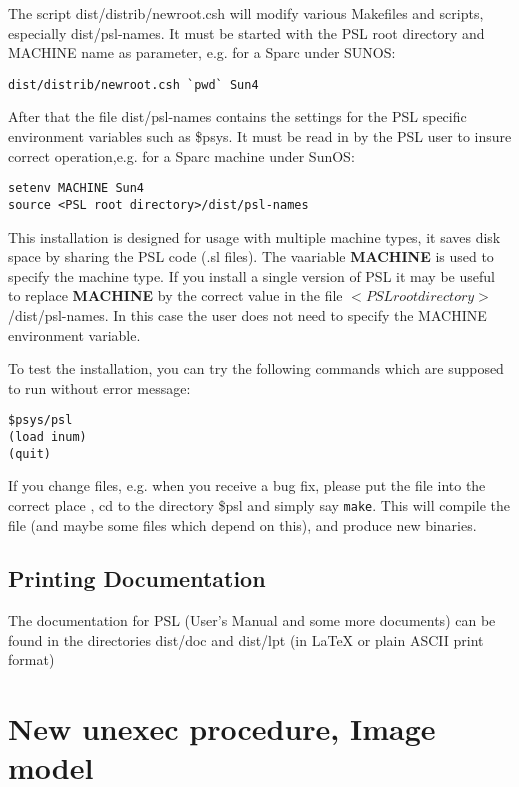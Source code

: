 The script dist/distrib/newroot.csh will modify various Makefiles and
scripts, especially dist/psl-names. It must be started with the
PSL root directory and MACHINE name as parameter, e.g. for a Sparc under
SUNOS:

\begin{verbatim}
dist/distrib/newroot.csh `pwd` Sun4
\end{verbatim}

After that the file dist/psl-names contains the settings for the  
PSL specific environment variables such as \$psys. It must be
read in by the PSL user to insure correct operation,e.g. for a
Sparc machine under SunOS:

\begin{verbatim}
setenv MACHINE Sun4
source <PSL root directory>/dist/psl-names
\end{verbatim}

This installation is designed for usage with multiple machine types,
it saves disk space by sharing the PSL code (.sl files).
The vaariable  {\bf MACHINE} is used to specify the machine type.
If you install a single version of PSL it may be useful to
replace {\bf MACHINE} by the correct value in the file
$<PSL root directory>$/dist/psl-names. In this case the
user does not need to specify the MACHINE environment variable.

To test the installation, you can try the following commands which
are supposed to run without error message:

\begin{verbatim}   
$psys/psl
(load inum)
(quit)
\end{verbatim}   

If you change files, e.g. when you receive a bug fix, please 
put the file into the correct place , cd to the directory \$psl and
simply say {\tt make}. This will compile the file (and maybe some
files which depend on this), and produce new binaries.

\subsection{Printing Documentation}

The documentation for PSL (User's Manual and some more documents)
can be found in the directories 
dist/doc and dist/lpt (in {\LaTeX} or plain ASCII print format)

\section{New unexec procedure, Image model}

